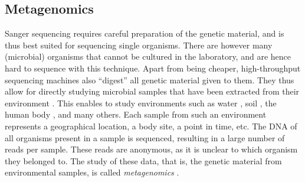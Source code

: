 

\subsection{Metagenomics}
\label{ch:Foundations:sec:SequenceAnalysis:sub:Metagenomics}

Sanger sequencing requires careful preparation of the genetic material,
and is thus best suited for sequencing single organisms.
There are however many (microbial) organisms that cannot be cultured in the laboratory,
and are hence hard to sequence with this technique.
Apart from being cheaper, high-throughput sequencing machines also ``digest'' all genetic material given to them.
They thus allow for directly studying microbial samples
that have been extracted from their environment \cite{Morgan2010,Edwards2013,Sunagawa2013a}.
This enables to study environments such as
water \cite{Karsenti2011,Giner2016,Gran-Stadniczenko2017},
soil \cite{Dupont2016,Mahe2017},
the human body \cite{Huttenhower2012,Methe2012,Matsen2015,Wang2015},
and many others.
Each sample from such an environment represents a geographical location, a body site, a point in time, etc.
The \ac{DNA} of all organisms present in a sample is sequenced,
resulting in a large number of reads per sample.
These reads are anonymous, as it is unclear to which organism they belonged to.
The study of these data, that is, the genetic material from environmental samples,
is called \emph{metagenomics} \cite{Oulas2015}.


